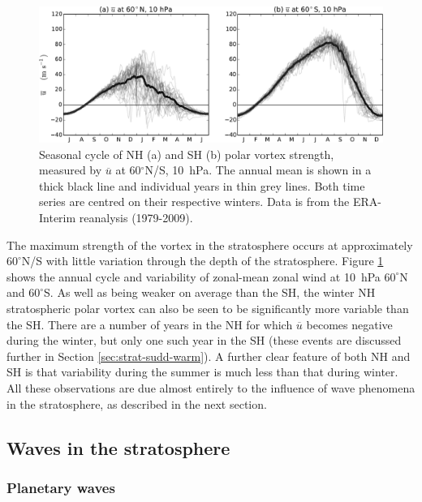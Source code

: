\begin{figure}
 \centering
 \noindent\includegraphics[width=\textwidth]{figures/chapter-intro/zmzw_NH_SH.pdf}
 \caption[Comparison of NH and SH polar vortex seasonal cycle.]{Seasonal cycle
   of NH (a) and SH (b) polar vortex strength, measured by $\overline{u}$ at
   60$^{\circ}$N/S, 10~hPa. The annual mean is shown in a thick black line and
   individual years in thin grey lines. Both time series are centred on their
   respective winters. Data is from the ERA-Interim reanalysis (1979-2009).}
 \label{fig:zmzw_NH_SH}
\end{figure}

The maximum strength of the vortex in the stratosphere occurs at approximately
$60^{\circ}$N/S with little variation through the depth of the
stratosphere. Figure \ref{fig:zmzw_NH_SH} shows the annual cycle and variability
of zonal-mean zonal wind at 10~hPa $60^{\circ}$N and $60^{\circ}$S. As well as
being weaker on average than the SH, the winter NH stratospheric polar vortex
can also be seen to be significantly more variable than the SH. There are a
number of years in the NH for which $\overline{u}$ becomes negative during the
winter, but only one such year in the SH (these events are discussed further in
Section \ref{sec:strat-sudd-warm}). A further clear feature of both NH and SH is
that variability during the summer is much less than that during winter. All
these observations are due almost entirely to the influence of wave phenomena in
the stratosphere, as described in the next section.


\subsection{Waves in the stratosphere}
\label{sec:plan-waves-strat}

\subsubsection{Planetary waves}
\label{sec:planetary-waves}

